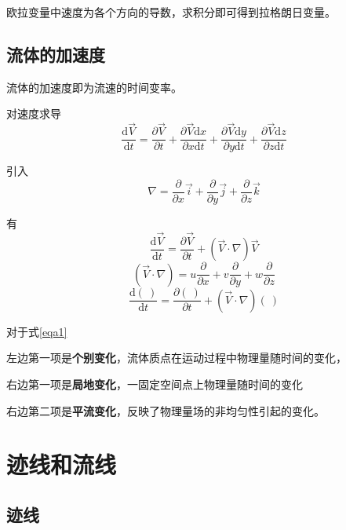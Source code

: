 \documentclass[a4paper,oneside]{ctexbook}
\begin{document}
欧拉变量中速度为各个方向的导数，求积分即可得到拉格朗日变量。

\subsection{流体的加速度}

流体的加速度即为流速的时间变率。

对速度求导
\begin{equation}
    \dfrac{\mathrm{d}\overrightarrow{V}}{\mathrm{d}t}=\dfrac{\partial{}\overrightarrow{V}}{\partial{t}}+\dfrac{\partial{}\overrightarrow{V}\mathrm{d}x}{\partial{x}\mathrm{d}t}+\dfrac{\partial{}\overrightarrow{V}\mathrm{d}y}{\partial{y}\mathrm{d}t}+\dfrac{\partial{}\overrightarrow{V}\mathrm{d}z}{\partial{z}\mathrm{d}t}
\end{equation}

引入
\begin{equation}
    \nabla=\dfrac{\partial}{\partial{x}}\overrightarrow{i}+\dfrac{\partial}{\partial{y}}\overrightarrow{j}+\dfrac{\partial}{\partial{z}}\overrightarrow{k}
\end{equation}

有
\begin{equation}
    \dfrac{\mathrm{d}\overrightarrow{V}}{\mathrm{d}t}=\dfrac{\partial{\overrightarrow{V}}}{\partial{t}}+(\overrightarrow{V}\cdot\nabla)\overrightarrow{V}
\end{equation}
\begin{equation}(\overrightarrow{V}\cdot\nabla)=u\dfrac{\partial}{\partial{x}}+v\dfrac{\partial}{\partial{y}}+w\dfrac{\partial}{\partial{z}}\end{equation}
\begin{equation}\dfrac{\mathrm{d}(\ )}{\mathrm{d}t}=\dfrac{\partial{(\ )}}{\partial{t}}+(\overrightarrow{V}\cdot\nabla)(\ )\label{eqa1}\end{equation}

对于式\ref{eqa1}

左边第一项是\textbf{个别变化}，流体质点在运动过程中物理量随时间的变化，

右边第一项是\textbf{局地变化}，一固定空间点上物理量随时间的变化

右边第二项是\textbf{平流变化}，反映了物理量场的非均匀性引起的变化。

\section{迹线和流线}

\subsection{迹线}
\end{document}
